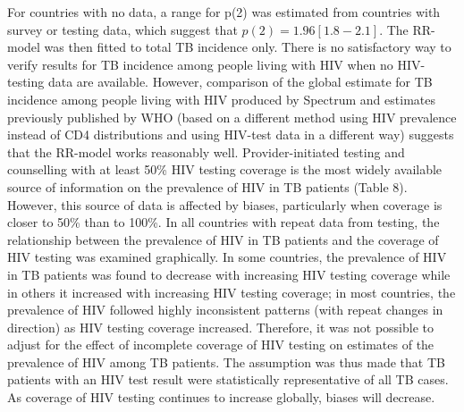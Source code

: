For countries with no data, a range for p(2) was estimated from countries with survey or testing data, which suggest that $p(2) = 1.96 [1.8-2.1]$. The RR-model was then fitted to total TB incidence only. There is no satisfactory way to verify results for TB incidence among people living with HIV when no HIV-testing data are available. However, comparison of the global estimate for TB incidence among people living with HIV produced by Spectrum and estimates previously published by WHO (based on a different method using HIV prevalence instead of CD4 distributions and using  HIV-test data in a different way) suggests that the RR-model works reasonably well.
Provider-initiated testing and counselling with at least 50\% HIV testing coverage is the most widely available source of information on the prevalence of HIV in TB patients (Table 8). However, this source of data is affected by biases, particularly when coverage is closer to 50\% than to 100\%. In all countries with repeat data from testing, the relationship between the prevalence of HIV in TB patients and the coverage of HIV testing was examined graphically. In some countries, the prevalence of HIV in TB patients was found to decrease with increasing HIV testing coverage while in others it increased with increasing HIV testing coverage; in most countries, the prevalence of HIV followed highly inconsistent patterns (with repeat changes in direction) as HIV testing coverage increased. Therefore, it was not possible to adjust for the effect of incomplete coverage of HIV testing on estimates of the prevalence of HIV among TB patients. The assumption was thus made that TB patients with an HIV test result were statistically representative of all TB cases. As coverage of HIV testing continues to increase globally, biases will decrease. 


